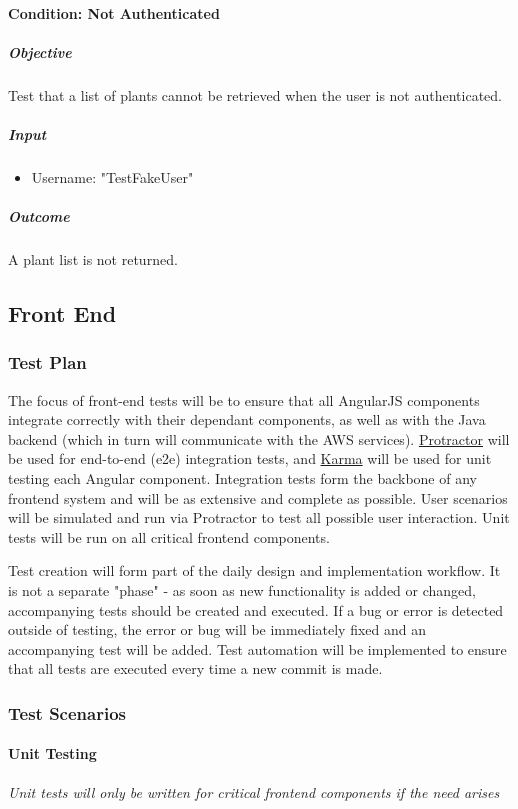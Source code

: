\documentclass{article}
\begin{document}
		\paragraph{Condition: Not Authenticated}
		\subparagraph{Objective}
		Test that a list of plants cannot be retrieved when the user is not authenticated.
		\subparagraph{Input}
		\begin{itemize}
			\item Username: "TestFakeUser"
		\end{itemize}
		
		\subparagraph{Outcome}
		A plant list is not returned.

		
	\subsection{Front End}
		\subsubsection{Test Plan}
		The focus of front-end tests will be to ensure that all AngularJS components integrate correctly with their dependant components, as well as with the Java backend (which in turn will communicate with the AWS services). \href{http://www.protractortest.org/#/}{Protractor} will be used for end-to-end (e2e) integration tests, and \href{https://karma-runner.github.io/1.0/index.html}{Karma} will be used for unit testing each Angular component. Integration tests form the backbone of any frontend system and will be as extensive and complete as possible. User scenarios will be simulated and run via Protractor to test all possible user interaction. Unit tests will be run on all critical frontend components.
		
		Test creation will form part of the daily design and implementation workflow. It is not a separate "phase" - as soon as new functionality is added or changed, accompanying tests should be created and executed. If a bug or error is detected outside of testing, the error or bug will be immediately fixed and an accompanying test will be added. Test automation will be implemented to ensure that all tests are executed every time a new commit is made. 
			
		\subsubsection{Test Scenarios}
			\paragraph{Unit Testing}
				\textit{Unit tests will only be written for critical frontend components if the need arises}
\end{document}
